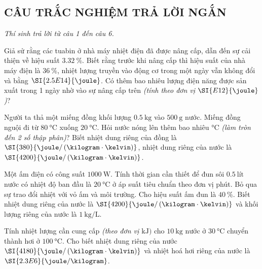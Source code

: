 \subsection{CÂU TRẮC NGHIỆM TRẢ LỜI NGẮN}
\setcounter{ex}{0}
\textit{Thí sinh trả lời từ câu 1 đến câu 6.}
\begin{ex}
Giả sử rằng các tuabin ở nhà máy nhiệt điện đã được nâng cấp, dẫn đến sự cải thiện về hiệu suất $\SI{3.32}{\percent}$. Biết rằng trước khi nâng cấp thì hiệu suất của nhà máy điện là $\SI{36}{\percent}$, nhiệt lượng truyền vào động cơ trong một ngày vẫn không đổi và bằng $\SI{2.5E14}{\joule}$. Có thêm bao nhiêu lượng điện năng được sản xuất trong 1 ngày nhờ vào sự nâng cấp trên \textit{(tính theo đơn vị  $\SI{E12}{\joule}$)}?
\end{ex}
\begin{ex}
	Người ta thả một miếng đồng khối lượng $\SI{0.5}{\kilogram}$ vào $\SI{500}{\gram}$ nước. Miếng đồng nguội đi từ $\SI{80}{\celsius}$ xuống $\SI{20}{\celsius}$. Hỏi nước nóng lên thêm bao nhiêu $\si{\celsius}$ \textit{(làm tròn đến 2 số thập phân)}? Biết nhiệt dung riêng của đồng là $\SI{380}{\joule/\left(\kilogram\cdot\kelvin\right)}$, nhiệt dung riêng của nước là $\SI{4200}{\joule/\left(\kilogram\cdot\kelvin\right)}$.
\end{ex}
\begin{ex}
Một ấm điện có công suất $\SI{1000}{\watt}$. Tính thời gian cần thiết để đun sôi $\SI{0.5}{\text{lít}}$ nước có nhiệt độ ban đầu là $\SI{20}{\celsius}$ ở áp suất tiêu chuẩn theo đơn vị phút. Bỏ qua sự trao đổi nhiệt với vỏ ấm và môi trường. Cho hiệu suất ấm đun là $\SI{40}{\percent}$. Biết nhiệt dung riêng của nước là $\SI{4200}{\joule/\left(\kilogram\cdot\kelvin\right)}$ và khối lượng riêng của nước là $\SI{1}{\kilogram/\liter}$.
\end{ex}
\begin{ex}
	Tính nhiệt lượng cần cung cấp \textit{(theo đơn vị $\si{\kilo\joule})$} cho $\SI{10}{\kilogram}$ nước ở $\SI{30}{\celsius}$ chuyển thành hơi ở $\SI{100}{\celsius}$. Cho biết nhiệt dung riêng của nước $\SI{4180}{\joule/\left(\kilogram\cdot\kelvin\right)}$ và nhiệt hoá hơi riêng của nước là $\SI{2.3E6}{\joule/\kilogram}$.
\end{ex}
